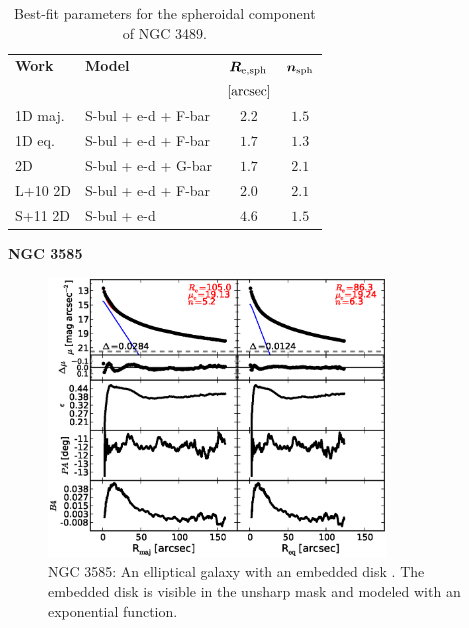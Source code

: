 \documentclass[preprint2]{emulateapj}
\newcommand{\fitfigurewidth}{0.8\textwidth}
\begin{document}
  \begin{table}[h]
  \small
  \caption{Best-fit parameters for the spheroidal component of NGC 3489.}
  \begin{center}
  \begin{tabular}{llcc}
  \hline
  {\bf Work} & {\bf Model}   & $\bm R_{\rm e,sph}$    & $\bm n_{\rm sph}$ \\
    &  &  $[\rm arcsec]$ & \\
  \hline
  1D maj. & S-bul + e-d + F-bar & $2.2$  &  $1.5$ \\
  1D eq.  & S-bul + e-d + F-bar & $1.7$  &  $1.3$ \\
  2D      & S-bul + e-d + G-bar & $1.7$  &  $2.1$ \\
  \hline
  L+10 2D         & S-bul + e-d + F-bar & $2.0$  &  $2.1$ \\
  S+11 2D         & S-bul + e-d & $4.6$  &  $1.5$ \\
  \hline
  \end{tabular}
  \end{center}
  \label{tab:n3489}
  \end{table}


  \clearpage\newpage\noindent

  {\bf NGC 3585 \\}

  \begin{figure}[h]
  \begin{center}
  \includegraphics[width=\fitfigurewidth]{images/n3585_1Dfit.eps}
  \caption{NGC 3585: 
  An elliptical galaxy with an embedded disk \citep{scorzabender1995}. 
  The embedded disk is visible in the unsharp mask and modeled with an exponential function. }
  \end{center}
  \end{figure}
\end{document}
